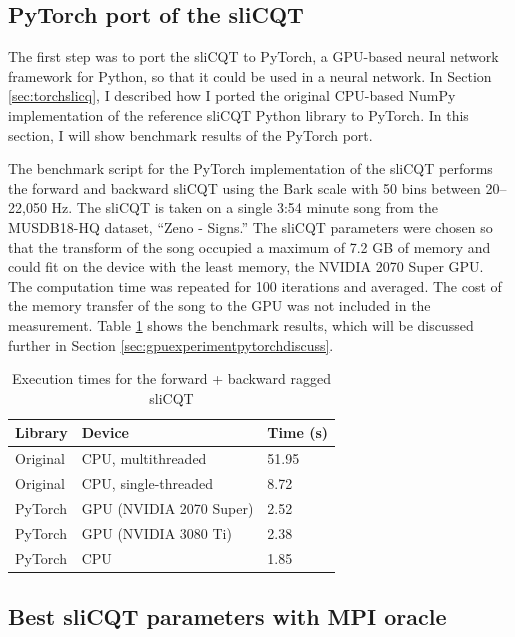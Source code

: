 \documentclass[report.tex]{subfiles}
\begin{document}
\subsection{PyTorch port of the sliCQT}
\label{sec:gpuexperimentpytorch}

The first step was to port the sliCQT to PyTorch, a GPU-based neural network framework for Python, so that it could be used in a neural network. In Section \ref{sec:torchslicq}, I described how I ported the original CPU-based NumPy implementation of the reference sliCQT Python library to PyTorch. In this section, I will show benchmark results of the PyTorch port.

The benchmark script for the PyTorch implementation of the sliCQT performs the forward and backward sliCQT using the Bark scale with 50 bins between 20--22,050 Hz. The sliCQT is taken on a single 3:54 minute song from the MUSDB18-HQ dataset, ``Zeno - Signs.'' The sliCQT parameters were chosen so that the transform of the song occupied a maximum of 7.2 GB of memory and could fit on the device with the least memory, the NVIDIA 2070 Super GPU. The computation time was repeated for 100 iterations and averaged. The cost of the memory transfer of the song to the GPU was not included in the measurement. Table \ref{table:nsgttorchresultsragged} shows the benchmark results, which will be discussed further in Section \ref{sec:gpuexperimentpytorchdiscuss}.

\begin{table}[ht]
	\centering
	\caption{Execution times for the forward + backward ragged sliCQT}
	\label{table:nsgttorchresultsragged}
	\begin{tabular}{ |l|l|l| }
	 \hline
		Library & Device & Time (s) \\
	 \hline
	 \hline
		Original & CPU, multithreaded & 51.95  \\
	 \hline
		Original & CPU, single-threaded & 8.72  \\
	 \hline
		PyTorch & GPU (NVIDIA 2070 Super) & 2.52 \\
	 \hline
		PyTorch & GPU (NVIDIA 3080 Ti) &  2.38 \\
	 \hline
		PyTorch & CPU & 1.85  \\
	 \hline
\end{tabular}
\end{table}

\subsection{Best sliCQT parameters with MPI oracle}
\label{sec:slicqparamresults}
\end{document}
